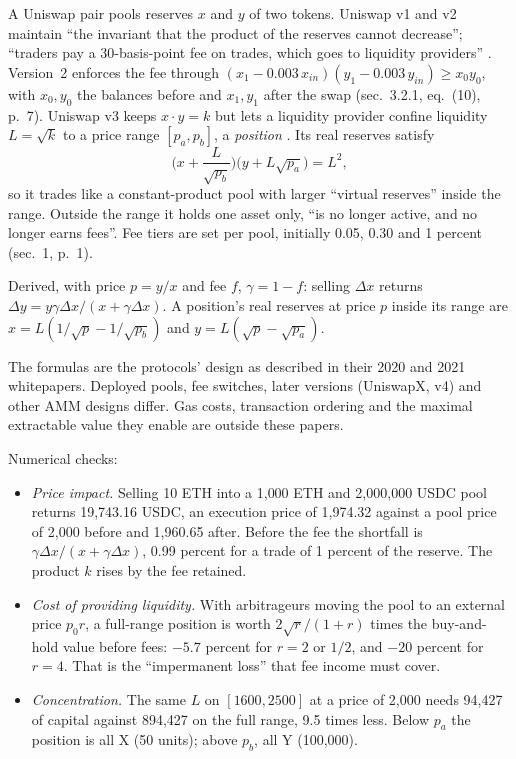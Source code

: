\begin{qfdefinition}\label{def:amm-pool-mechanics}
 A Uniswap pair pools reserves $x$ and $y$ of two tokens. Uniswap v1 and v2 maintain ``the invariant that the product of the reserves cannot decrease''; ``traders pay a 30-basis-point fee on trades, which goes to liquidity providers'' \citep[sec.~1, p.~1]{uniswap-v2-2020}. Version~2 enforces the fee through $(x_1-0.003\,x_{in})(y_1-0.003\,y_{in})\ge x_0y_0$, with $x_0,y_0$ the balances before and $x_1,y_1$ after the swap (sec.~3.2.1, eq.~(10), p.~7). Uniswap v3 keeps $x\cdot y=k$ but lets a liquidity provider confine liquidity $L=\sqrt k$ to a price range $[p_a,p_b]$, a \emph{position} \citep[sec.~2, eqs.~(2.1)--(2.2), p.~2]{s6-uniswap}. Its real reserves satisfy
\[ \Big(x+\frac{L}{\sqrt{p_b}}\Big)\big(y+L\sqrt{p_a}\big)=L^2, \]
so it trades like a constant-product pool with larger ``virtual reserves'' inside the range. Outside the range it holds one asset only, ``is no longer active, and no longer earns fees''. Fee tiers are set per pool, initially 0.05, 0.30 and 1 percent (sec.~1, p.~1).

 Derived, with price $p=y/x$ and fee $f$, $\gamma=1-f$: selling $\Delta x$ returns $\Delta y=y\gamma\Delta x/(x+\gamma\Delta x)$. A position's real reserves at price $p$ inside its range are $x=L(1/\sqrt p-1/\sqrt{p_b})$ and $y=L(\sqrt p-\sqrt{p_a})$.

 The formulas are the protocols' design as described in their 2020 and 2021 whitepapers. Deployed pools, fee switches, later versions (UniswapX, v4) and other AMM designs differ. Gas costs, transaction ordering and the maximal extractable value they enable are outside these papers.

 Numerical checks:
\begin{itemize}
\item \emph{Price impact.} Selling 10 ETH into a 1{,}000 ETH and 2{,}000{,}000 USDC pool returns 19{,}743.16 USDC, an execution price of 1{,}974.32 against a pool price of 2{,}000 before and 1{,}960.65 after. Before the fee the shortfall is $\gamma\Delta x/(x+\gamma\Delta x)$, 0.99 percent for a trade of 1 percent of the reserve. The product $k$ rises by the fee retained.
\item \emph{Cost of providing liquidity.} With arbitrageurs moving the pool to an external price $p_0r$, a full-range position is worth $2\sqrt r/(1+r)$ times the buy-and-hold value before fees: $-5.7$ percent for $r=2$ or $1/2$, and $-20$ percent for $r=4$. That is the ``impermanent loss'' that fee income must cover.
\item \emph{Concentration.} The same $L$ on $[1600,2500]$ at a price of 2{,}000 needs 94{,}427 of capital against 894{,}427 on the full range, 9.5 times less. Below $p_a$ the position is all X (50 units); above $p_b$, all Y (100{,}000).
\end{itemize}


\end{qfdefinition}
